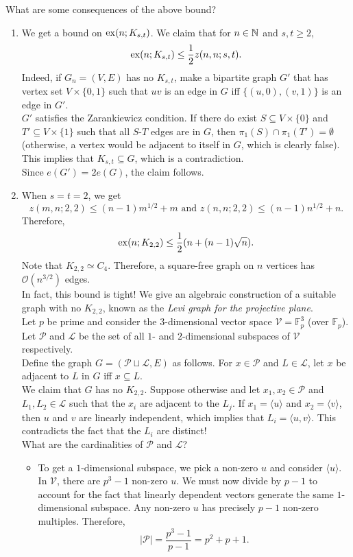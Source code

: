 \documentclass{article}
\begin{document}
		What are some consequences of the above bound?
		\begin{enumerate}
			\item We get a bound on $\operatorname{ex}(n;K_{s,t})$. We claim that for $n\in\mathbb{N}$ and $s,t\ge 2$,
			\[ \operatorname{ex}(n;K_{s,t}) \le \frac{1}{2} z(n,n;s,t). \]
			Indeed, if $G_n = (V,E)$ has no $K_{s,t}$, make a bipartite graph $G'$ that has vertex set $V \times \{0,1\}$ such that $uv$ is an edge in $G$ iff $\{(u,0),(v,1)\}$ is an edge in $G'$.\\
			$G'$ satisfies the Zarankiewicz condition. If there do exist $S \subseteq V\times\{0\}$ and $T' \subseteq V \times \{1\}$ such that all $S$-$T$ edges are in $G$, then $\pi_1(S) \cap \pi_1(T') = \emptyset$ (otherwise, a vertex would be adjacent to itself in $G$, which is clearly false). This implies that $K_{s,t} \subseteq G$, which is a contradiction.\\
			Since $e(G') = 2e(G)$, the claim follows.

			\item When $s=t=2$, we get
			\[ z(m,n;2,2) \le (n-1)m^{1/2} + m \text{ and } z(n,n;2,2) \le (n-1)n^{1/2} + n. \]
			Therefore,
			\[ \operatorname{ex}(n;K_{2,2}) \le \frac{1}{2} (n + (n-1)\sqrt{n}). \]
			Note that $K_{2,2}\simeq C_4$. Therefore, a square-free graph on $n$ vertices has $\mathcal{O}(n^{3/2})$ edges.\\

			In fact, this bound is tight! We give an algebraic construction of a suitable graph with no $K_{2,2}$, known as the \emph{Levi graph for the projective plane}.\\
			Let $p$ be prime and consider the $3$-dimensional vector space $\mathcal{V} = \mathbb{F}_p^3$ (over $\mathbb{F}_p$). Let $\mathcal{P}$ and $\mathcal{L}$ be the set of all $1$- and $2$-dimensional subspaces of $\mathcal{V}$ respectively.\\
			Define the graph $G = ( \mathcal{P} \sqcup \mathcal{L} , E )$ as follows. For $x \in \mathcal{P}$ and $L \in \mathcal{L}$, let $x$ be adjacent to $L$ in $G$ iff $x \subseteq L$.\\
			We claim that $G$ has no $K_{2,2}$. Suppose otherwise and let $x_1,x_2\in\mathcal{P}$ and $L_1,L_2\in\mathcal{L}$ such that the $x_i$ are adjacent to the $L_j$. If $x_1 = \langle u \rangle$ and $x_2 = \langle v \rangle$, then $u$ and $v$ are linearly independent, which implies that $L_i = \langle u,v\rangle$. This contradicts the fact that the $L_i$ are distinct!\\
			What are the cardinalities of $\mathcal{P}$ and $\mathcal{L}$?
			\begin{itemize}
				\item To get a $1$-dimensional subspace, we pick a non-zero $u$ and consider $\langle u\rangle$. In $\mathcal{V}$, there are $p^3 - 1$ non-zero $u$. We must now divide by $p-1$ to account for the fact that linearly dependent vectors generate the same $1$-dimensional subspace. Any non-zero $u$ has precisely $p-1$ non-zero multiples. Therefore,
				\[ |\mathcal{P}| = \frac{p^3 - 1}{p - 1} = p^2 + p + 1. \]


\end{itemize}
\end{enumerate}
\end{document}
